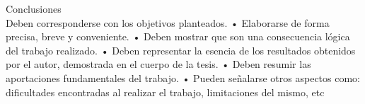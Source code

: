 \begin{conclusions}
    Conclusiones
    \\
    Deben corresponderse con los objetivos planteados.
    • Elaborarse de forma precisa, breve y conveniente.
    • Deben mostrar que son una consecuencia lógica del
    trabajo realizado.
    • Deben representar la esencia de los resultados obtenidos
    por el autor, demostrada en el cuerpo de la tesis.
    • Deben resumir las aportaciones fundamentales del
    trabajo.
    • Pueden señalarse otros aspectos como: dificultades
    encontradas al realizar el trabajo, limitaciones del mismo,
    etc
\end{conclusions}
